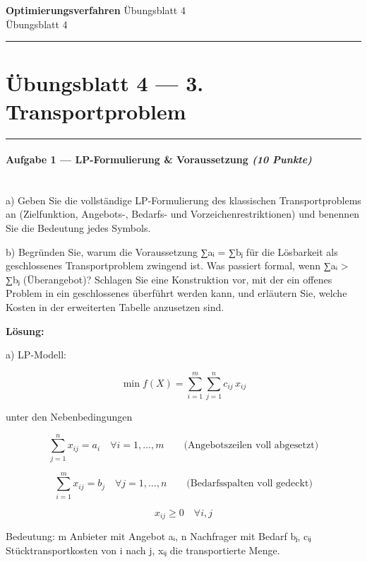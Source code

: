 \documentclass[11pt, a4paper]{article}
\providecommand{\nichttitle}{Übungsblatt}
\providecommand{\nichtsubtitle}{}
\renewcommand{\nichttitle}{Optimierungsverfahren}
\renewcommand{\nichtsubtitle}{Übungsblatt 4}
\begin{document}
\begin{center}
{\Large\bfseries\color{accent}\nichttitle}
\ifx\nichtsubtitle\empty\else
  \\[2pt]{\normalsize\color{accent!80!black}\nichtsubtitle}
\fi
\\[2pt]
\color{accent}\rule{0.4\linewidth}{0.8pt}\color{black}
\end{center}
\vspace{4pt}


\section{Übungsblatt 4 — 3. Transportproblem}


\noindent\textcolor{rulegray}{\rule{\linewidth}{0.4pt}}


\paragraph{Aufgabe 1 — LP-Formulierung \& Voraussetzung \textit{(10 Punkte)}}\mbox{}\\[2pt]

a) Geben Sie die vollständige LP-Formulierung des klassischen Transportproblems an (Zielfunktion, Angebots-, Bedarfs- und Vorzeichenrestriktionen) und benennen Sie die Bedeutung jedes Symbols.


b) Begründen Sie, warum die Voraussetzung ∑aᵢ = ∑bⱼ für die Lösbarkeit als geschlossenes Transportproblem zwingend ist. Was passiert formal, wenn ∑aᵢ > ∑bⱼ (Überangebot)? Schlagen Sie eine Konstruktion vor, mit der ein offenes Problem in ein geschlossenes überführt werden kann, und erläutern Sie, welche Kosten in der erweiterten Tabelle anzusetzen sind.


\textbf{Lösung:}


a) LP-Modell:


\[
\min f(X) = \sum_{i=1}^{m}\sum_{j=1}^{n} c_{ij}\,x_{ij}
\]


unter den Nebenbedingungen


\[
\sum_{j=1}^{n} x_{ij} = a_i \quad \forall i=1,\dots,m \qquad \text{(Angebotszeilen voll abgesetzt)}
\]

\[
\sum_{i=1}^{m} x_{ij} = b_j \quad \forall j=1,\dots,n \qquad \text{(Bedarfsspalten voll gedeckt)}
\]

\[
x_{ij} \ge 0 \quad \forall i,j
\]


Bedeutung: m Anbieter mit Angebot aᵢ, n Nachfrager mit Bedarf bⱼ, cᵢⱼ Stücktransportkosten von i nach j, xᵢⱼ die transportierte Menge.
\end{document}
